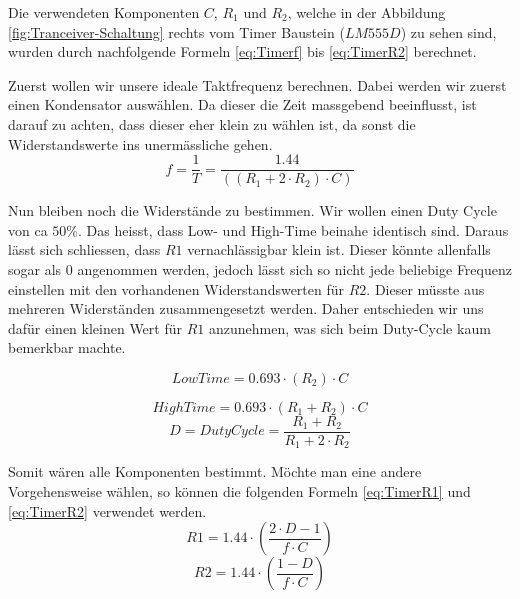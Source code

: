 Die verwendeten Komponenten $C$, $R_{1}$ und $R_{2}$, welche in der Abbildung  \ref{fig:Tranceiver-Schaltung} rechts vom Timer Baustein ($LM555D$) zu sehen sind, wurden durch nachfolgende Formeln \ref{eq:Timerf} bis \ref{eq:TimerR2} berechnet. 


Zuerst wollen wir unsere ideale Taktfrequenz berechnen. Dabei werden wir zuerst einen Kondensator auswählen. Da dieser die Zeit massgebend beeinflusst, ist darauf zu achten, dass dieser eher klein zu wählen ist, da sonst die Widerstandswerte ins unermässliche gehen.
\begin{equation}\label{eq:Timerf}
f= \dfrac{1}{T}= \dfrac{1.44}{((R_{1} + 2 \cdot R_{2})\cdot C)}
\end{equation}

Nun bleiben noch die Widerstände zu bestimmen. Wir wollen einen Duty Cycle von ca $50\%$. Das heisst, dass Low- und High-Time beinahe identisch sind. Daraus lässt sich schliessen, dass $R1$ vernachlässigbar klein ist. Dieser könnte allenfalls sogar als $0$ angenommen werden, jedoch lässt sich so nicht jede beliebige Frequenz einstellen mit den vorhandenen Widerstandswerten für $R2$. Dieser müsste aus mehreren Widerständen zusammengesetzt werden. Daher entschieden wir uns dafür einen kleinen Wert für $R1$ anzunehmen, was sich beim Duty-Cycle kaum bemerkbar machte.


\begin{equation}\label{eq:TimerT}
LowTime= 0.693 \cdot (R_{2}) \cdot C
\end{equation}

\begin{equation}\label{eq:TimerTH}
HighTime= 0.693 \cdot (R_{1} + R_{2}) \cdot C
\end{equation}
\begin{equation}\label{eq:TimerDC}
D = DutyCycle = \dfrac{R_{1} + R_{2}}{R_{1} + 2 \cdot R_{2}}
\end{equation}

Somit wären alle Komponenten bestimmt. Möchte man eine andere Vorgehensweise wählen, so können die folgenden Formeln \ref{eq:TimerR1} und \ref{eq:TimerR2} verwendet werden.
\begin{equation}\label{eq:TimerR1}
R1 = 1.44 \cdot \left( \dfrac{2 \cdot D - 1}{f \cdot C} \right)
\end{equation}
\begin{equation}\label{eq:TimerR2}
R2 = 1.44 \cdot \left( \dfrac{1-D}{f \cdot C} \right)
\end{equation} 


